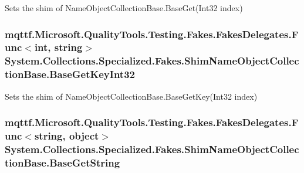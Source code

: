 Sets the shim of Name\-Object\-Collection\-Base.\-Base\-Get(\-Int32 index)

\hypertarget{class_system_1_1_collections_1_1_specialized_1_1_fakes_1_1_shim_name_object_collection_base_a6420026e75782f1b1a6641b3a78f43c1}{
\subsubsection[{Base\-Get\-Key\-Int32}]{\setlength{\rightskip}{0pt plus 5cm}mqttf.\-Microsoft.\-Quality\-Tools.\-Testing.\-Fakes.\-Fakes\-Delegates.\-Func$<$int, string$>$ System.\-Collections.\-Specialized.\-Fakes.\-Shim\-Name\-Object\-Collection\-Base.\-Base\-Get\-Key\-Int32\hspace{0.3cm}{\ttfamily [set]}}}\label{class_system_1_1_collections_1_1_specialized_1_1_fakes_1_1_shim_name_object_collection_base_a6420026e75782f1b1a6641b3a78f43c1}


Sets the shim of Name\-Object\-Collection\-Base.\-Base\-Get\-Key(\-Int32 index)

\hypertarget{class_system_1_1_collections_1_1_specialized_1_1_fakes_1_1_shim_name_object_collection_base_abdc39d7aaf229a4857442293e3f421d4}{
\subsubsection[{Base\-Get\-String}]{\setlength{\rightskip}{0pt plus 5cm}mqttf.\-Microsoft.\-Quality\-Tools.\-Testing.\-Fakes.\-Fakes\-Delegates.\-Func$<$string, object$>$ System.\-Collections.\-Specialized.\-Fakes.\-Shim\-Name\-Object\-Collection\-Base.\-Base\-Get\-String\hspace{0.3cm}{\ttfamily [set]}}}\label{class_system_1_1_collections_1_1_specialized_1_1_fakes_1_1_shim_name_object_collection_base_abdc39d7aaf229a4857442293e3f421d4}


